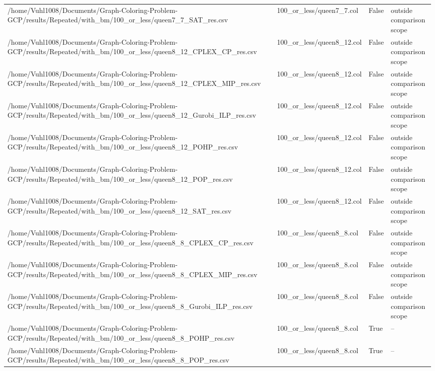 \begin{table}[htbp]
\begin{tabular}{llll}
/home/Vuhl1008/Documents/Graph-Coloring-Problem-GCP/results/Repeated/with\_bm/100\_or\_less/queen7\_7\_SAT\_res.csv & 100\_or\_less/queen7\_7.col & False & outside comparison scope \\
/home/Vuhl1008/Documents/Graph-Coloring-Problem-GCP/results/Repeated/with\_bm/100\_or\_less/queen8\_12\_CPLEX\_CP\_res.csv & 100\_or\_less/queen8\_12.col & False & outside comparison scope \\
/home/Vuhl1008/Documents/Graph-Coloring-Problem-GCP/results/Repeated/with\_bm/100\_or\_less/queen8\_12\_CPLEX\_MIP\_res.csv & 100\_or\_less/queen8\_12.col & False & outside comparison scope \\
/home/Vuhl1008/Documents/Graph-Coloring-Problem-GCP/results/Repeated/with\_bm/100\_or\_less/queen8\_12\_Gurobi\_ILP\_res.csv & 100\_or\_less/queen8\_12.col & False & outside comparison scope \\
/home/Vuhl1008/Documents/Graph-Coloring-Problem-GCP/results/Repeated/with\_bm/100\_or\_less/queen8\_12\_POHP\_res.csv & 100\_or\_less/queen8\_12.col & False & outside comparison scope \\
/home/Vuhl1008/Documents/Graph-Coloring-Problem-GCP/results/Repeated/with\_bm/100\_or\_less/queen8\_12\_POP\_res.csv & 100\_or\_less/queen8\_12.col & False & outside comparison scope \\
/home/Vuhl1008/Documents/Graph-Coloring-Problem-GCP/results/Repeated/with\_bm/100\_or\_less/queen8\_12\_SAT\_res.csv & 100\_or\_less/queen8\_12.col & False & outside comparison scope \\
/home/Vuhl1008/Documents/Graph-Coloring-Problem-GCP/results/Repeated/with\_bm/100\_or\_less/queen8\_8\_CPLEX\_CP\_res.csv & 100\_or\_less/queen8\_8.col & False & outside comparison scope \\
/home/Vuhl1008/Documents/Graph-Coloring-Problem-GCP/results/Repeated/with\_bm/100\_or\_less/queen8\_8\_CPLEX\_MIP\_res.csv & 100\_or\_less/queen8\_8.col & False & outside comparison scope \\
/home/Vuhl1008/Documents/Graph-Coloring-Problem-GCP/results/Repeated/with\_bm/100\_or\_less/queen8\_8\_Gurobi\_ILP\_res.csv & 100\_or\_less/queen8\_8.col & False & outside comparison scope \\
/home/Vuhl1008/Documents/Graph-Coloring-Problem-GCP/results/Repeated/with\_bm/100\_or\_less/queen8\_8\_POHP\_res.csv & 100\_or\_less/queen8\_8.col & True & -- \\
/home/Vuhl1008/Documents/Graph-Coloring-Problem-GCP/results/Repeated/with\_bm/100\_or\_less/queen8\_8\_POP\_res.csv & 100\_or\_less/queen8\_8.col & True & -- \\

\end{tabular}
\end{table}
